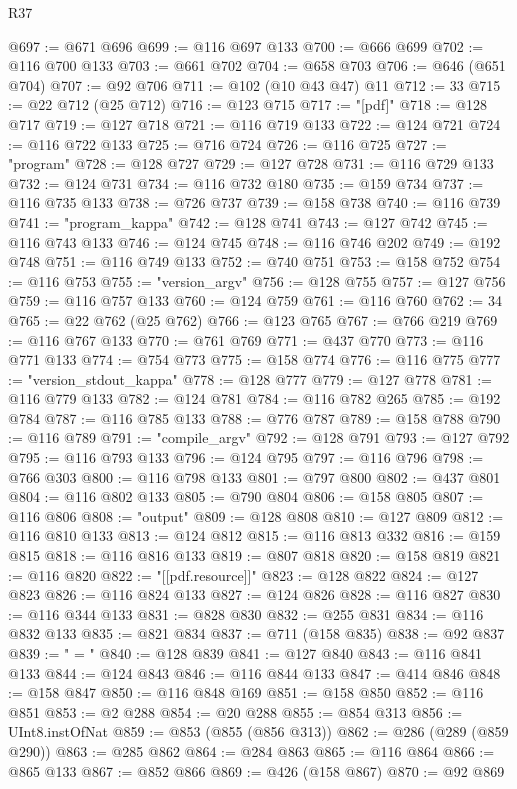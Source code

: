 \begin{lexlean}{R37}
\begin{coremodule}
@697 := @671 @696
@699 := @116 @697 @133
@700 := @666 @699
@702 := @116 @700 @133
@703 := @661 @702
@704 := @658 @703
@706 := @646 (@651 @704)
@707 := @92 @706
@711 := @102 (@10 @43 @47) @11
@712 := 33
@715 := @22 @712 (@25 @712)
@716 := @123 @715
@717 := "[pdf]"
@718 := @128 @717
@719 := @127 @718
@721 := @116 @719 @133
@722 := @124 @721
@724 := @116 @722 @133
@725 := @716 @724
@726 := @116 @725
@727 := "program"
@728 := @128 @727
@729 := @127 @728
@731 := @116 @729 @133
@732 := @124 @731
@734 := @116 @732 @180
@735 := @159 @734
@737 := @116 @735 @133
@738 := @726 @737
@739 := @158 @738
@740 := @116 @739
@741 := "program_kappa"
@742 := @128 @741
@743 := @127 @742
@745 := @116 @743 @133
@746 := @124 @745
@748 := @116 @746 @202
@749 := @192 @748
@751 := @116 @749 @133
@752 := @740 @751
@753 := @158 @752
@754 := @116 @753
@755 := "version_argv"
@756 := @128 @755
@757 := @127 @756
@759 := @116 @757 @133
@760 := @124 @759
@761 := @116 @760
@762 := 34
@765 := @22 @762 (@25 @762)
@766 := @123 @765
@767 := @766 @219
@769 := @116 @767 @133
@770 := @761 @769
@771 := @437 @770
@773 := @116 @771 @133
@774 := @754 @773
@775 := @158 @774
@776 := @116 @775
@777 := "version_stdout_kappa"
@778 := @128 @777
@779 := @127 @778
@781 := @116 @779 @133
@782 := @124 @781
@784 := @116 @782 @265
@785 := @192 @784
@787 := @116 @785 @133
@788 := @776 @787
@789 := @158 @788
@790 := @116 @789
@791 := "compile_argv"
@792 := @128 @791
@793 := @127 @792
@795 := @116 @793 @133
@796 := @124 @795
@797 := @116 @796
@798 := @766 @303
@800 := @116 @798 @133
@801 := @797 @800
@802 := @437 @801
@804 := @116 @802 @133
@805 := @790 @804
@806 := @158 @805
@807 := @116 @806
@808 := "output"
@809 := @128 @808
@810 := @127 @809
@812 := @116 @810 @133
@813 := @124 @812
@815 := @116 @813 @332
@816 := @159 @815
@818 := @116 @816 @133
@819 := @807 @818
@820 := @158 @819
@821 := @116 @820
@822 := "[[pdf.resource]]"
@823 := @128 @822
@824 := @127 @823
@826 := @116 @824 @133
@827 := @124 @826
@828 := @116 @827
@830 := @116 @344 @133
@831 := @828 @830
@832 := @255 @831
@834 := @116 @832 @133
@835 := @821 @834
@837 := @711 (@158 @835)
@838 := @92 @837
@839 := " = "
@840 := @128 @839
@841 := @127 @840
@843 := @116 @841 @133
@844 := @124 @843
@846 := @116 @844 @133
@847 := @414 @846
@848 := @158 @847
@850 := @116 @848 @169
@851 := @158 @850
@852 := @116 @851
@853 := @2 @288
@854 := @20 @288
@855 := @854 @313
@856 := UInt8.instOfNat
@859 := @853 (@855 (@856 @313))
@862 := @286 (@289 (@859 @290))
@863 := @285 @862
@864 := @284 @863
@865 := @116 @864
@866 := @865 @133
@867 := @852 @866
@869 := @426 (@158 @867)
@870 := @92 @869

\end{coremodule}
\end{lexlean}
